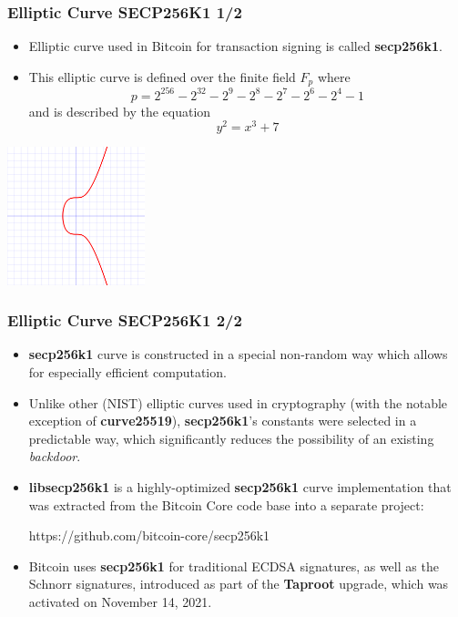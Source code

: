\documentclass{beamer}
\begin{document}
\begin{frame}
  \frametitle{Elliptic Curve SECP256K1 1/2}
  \begin{itemize}
  \item Elliptic curve used in Bitcoin for transaction signing is called
    \textbf{secp256k1}.
    
  \item This elliptic curve is defined over the finite field $F_p$ where
    $$p = 2^{256} - 2^{32} - 2^9 - 2^8 - 2^7 - 2^6 - 2^4 - 1$$
    and is described by the equation
    $$y^2 = x^3 + 7$$
  \end{itemize}
  \begin{center}
    \includegraphics[width=0.3\textwidth]{secp256k1}
  \end{center}
\end{frame}

\begin{frame}
  \frametitle{Elliptic Curve SECP256K1 2/2}
  \begin{itemize}
  \item \textbf{secp256k1} curve is constructed in a special non-random way
    which allows for especially efficient computation.
  \item Unlike other (NIST) elliptic curves used in cryptography (with the
    notable exception of \textbf{curve25519}), \textbf{secp256k1}'s constants
    were selected in a predictable way, which significantly reduces the
    possibility of an existing \textit{backdoor}.
  \item \textbf{libsecp256k1} is a highly-optimized \textbf{secp256k1} curve
    implementation that was extracted from the Bitcoin Core code base into a
    separate project:
    \begin{center}
      https://github.com/bitcoin-core/secp256k1
    \end{center}
  \item Bitcoin uses \textbf{secp256k1} for traditional ECDSA signatures, as
    well as the Schnorr signatures, introduced as part of the \textbf{Taproot}
    upgrade, which was activated on November 14, 2021.
  \end{itemize}    
\end{frame}
\end{document}
